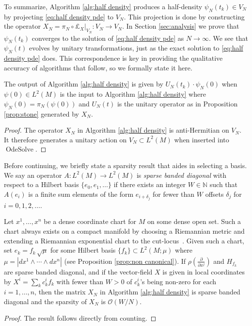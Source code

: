\documentclass[final,leqno]{siamart}
\newcommand{\pder}[2]{\ensuremath{\frac{ \partial #1}{\partial #2}}}
\begin{document}
To summarize, Algorithm \ref{alg:half density} produces a half-density $\psi_{N}(t_{k}) \in V_{N}$ by projecting \eqref{eq:half density pde} to $V_N$.
This projection is done by constructing the operator $X_{N} = \pi_{N} \circ \pounds_{X} |_{V_{N}}: V_{N} \to V_{N}$.
In Section \ref{sec:analysis} we prove that $\psi_{N}(t_{k})$ converges to the solution of \eqref{eq:half density pde} as $N \to \infty$.
We see that $\psi_{N}(t)$ evolves by unitary transformations, just as the exact solution to \eqref{eq:half density pde} does.
This correspondence is key in providing the qualitative accuracy of algorithms that follow, so we formally state it here.
\begin{proposition} \label{prop:unitary}
	The output of Algorithm \ref{alg:half density} is given by $U_{N}(t_{k}) \cdot \psi_{N}(0)$ when $\psi(0) \in L^2(M)$ is the input to Algorithm \ref{alg:half density} where $\psi_{N}(0) = \pi_{N}( \psi(0) )$ and $U_{N}(t)$ is the unitary operator as in Proposition \ref{prop:stone} generated by $X_{N}$.
\end{proposition}
\begin{proof}
	The operator $X_{N}$ in Algorithm \ref{alg:half density} is anti-Hermitian on $V_{N}$.
	It therefore generates a unitary action on $V_{N} \subset L^{2}(M)$ when inserted into $\operatorname{OdeSolve}$.
\end{proof}

Before continuing, we briefly state a sparsity result that aides in selecting a basis.
We say an operator $A : L^{2}(M) \to L^{2}(M)$ is \emph{sparse banded diagonal} with respect to a Hilbert basis $\{ e_{0} , e_{1},\dots\}$ if there exists an integer $W \in \mathbb{N}$
such that $A(e_{i})$ is a finite sum elements of the form $e_{i + \delta_{j}}$ for fewer than $W$ offsets $\delta_{j}$ for $i = 0,1,2, \dots$.
\begin{theorem} \label{thm:sparsity}
	Let $x^{1},\dots,x^{n}$ be a dense coordinate chart for $M$ on some dense open set.
	Such a chart always exists on a compact manifold by choosing a Riemannian metric and extending a Riemannian exponential chart to the cut-locus~\cite{Sakai1996}.
	Given such a chart, set $e_{k}= f_{k} \, \sqrt{\mu}$ for some Hilbert basis $\{f_{k}\} \subset L^2(M; \mu)$ where $\mu = | dx^{1} \wedge \cdots \wedge dx^{n}|$ (see Proposition \ref{prop:non canonical}).
	If $\rho( \pder{}{x^{j}})$ and $H_{f_{k}}$ are sparse banded diagonal, 
	and if the vector-field $X$ is given in local coordinates by $X^{i} = \sum_{k} c_{k}^{i} f_{k}$ with fewer than $W>0$ of $c^{i}_{k}$'s being non-zero for each $i=1,\dots,n$, then the matrix $X_{N}$ in Algorithm \ref{alg:half density} is sparse banded diagonal and the sparsity of $X_{N}$ is $\mathcal{O}( W / N )$.
\end{theorem}
\begin{proof}
The result follows directly from counting.
\end{proof}
\end{document}
